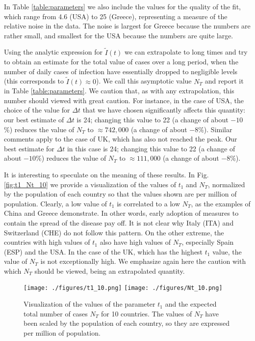 \documentclass[aps,preprint]{revtex4}
\newcommand{\Itild}{{\tilde I}}
\begin{document}
In Table \ref{table:parameters} we also include the values for the quality of the fit, 
which range from 4.6 (USA) to 25 (Greece), representing a measure of the 
relative noise in the data.  The noise is largest for Greece because the numbers are 
rather small, and smallest for the USA because the numbers are quite large. 


Using the analytic expression for $\Itild(t)$ we can extrapolate to long times and 
try to obtain an estimate for the total value of cases over a long period, 
when the number of daily cases of infection have essentially dropped to 
negligible levels (this corresponds to $\Itild(t) \approx 0$).  
We call this asymptotic value $N_T$ and report it in Table \ref{table:parameters}.  We caution that, 
as with any extrapolation, this number should viewed with great caution. 
For instance, in the case of USA, the choice of the value for $\Delta t$ that 
we have chosen significantly affects this quantity: our best estimate of
$\Delta t$ is 24; changing this value to 22 (a change of about $-10$\%) 
reduces the value of $N_T$ to $ \approx 742,000$ (a change of about $-8$\%). 
Similar comments apply to the case of UK, which has also not reached the peak.
Our best estimate for $\Delta t$ in this case is 24; changing this value to 22 
(a change of about $-10$\%) reduces the value of $N_T$ 
to $\approx 111,000$ (a change of about $-8$\%).


It is interesting to speculate on the meaning of these results. In Fig. \ref{fig:t1_Nt_10} 
we provide a visualization of the values of $t_1$ and $N_T$, normalized by 
the population of each country so that the values shown are per million of population. 
Clearly, a low value of $t_1$ is correlated to a low $N_T$, as the examples 
of China and Greece demonstrate.  In other words, early adoption of measures to 
contain the spread of the disease pay off.  
It is not clear why Italy (ITA) and Switzerland (CHE) do not follow this pattern. 
On the other extreme, the countries with high values of $t_1$ also have high values 
of $N_T$, especially Spain (ESP) and the USA.  
In the case of the UK, which has the highest $t_1$ value, the value of $N_T$ is not 
exceptionally high.
We emphasize again here the caution with which $N_T$ should be 
viewed, being an extrapolated quantity. 

\begin{figure}[h]
\hspace{-0.04\textwidth}
\texttt{[image: ./figures/t1\_10.png]}
\hspace{-0.04\textwidth}
\texttt{[image: ./figures/Nt\_10.png]}
\caption{
\small{
Visualization of the values of the parameter $t_1$ and the expected 
total number of cases $N_T$ for 10 countries. 
The values of $N_T$ have been scaled by the population of each country,
so they are expressed per million of population. 
}
}
\label{fig:t1_Nt_1 0}
\end{figure}
\end{document}
